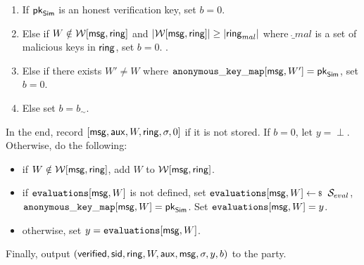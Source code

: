 \begin{tcolorbox}[left=2pt,right=2pt]
\begin{list}{\hspace*{1pt} C}{\setlength\leftmargin{0.15in}}
			\begin{enumerate}
				\item If   $ \mathsf{pk}_{\mathsf{Sim}} $ is an honest verification key, set $ b = 0 $. 
				\label{cond-main:forgery}
				
				\item Else if $ W \notin \mathcal{W}[\mathsf{msg},\mathsf{ring}] $ and $ |\mathcal{W}[\mathsf{msg}, \mathsf{ring}]| \geq |\mathsf{ring}_{mal}| $ where $ \ring_{mal} $ is a set of malicious keys in $ \mathsf{ring} $, set $ b = 0 $.
				\label{cond-main:uniqueness}.
				
				\item Else if there exists $ W' \neq W $ where  $ \mathtt{anonymous\_key\_map}[\mathsf{msg},W'] = \mathsf{pk}_{\mathsf{Sim}} $, set $ b = 0 $. \label{cond-main:differentWforsamepk} 
				\item Else set $ b = b_\sim$. \label{cond-main:simulatorbit}
			\end{enumerate}		
			
		\end{list}
		In the end,  record $ [\mathsf{msg},\mathsf{aux},W,\mathsf{ring},\sigma, 0] $ if it is not stored. If $ b = 0 $, let $y = \perp $. Otherwise,   do the following:
		\begin{itemize}
			\item if $ W \notin \mathcal{W}[\mathsf{msg},\mathsf{ring}] $, add $ W $ to $ \mathcal{W}[\mathsf{msg},\mathsf{ring}]  $.
			\item if $ \texttt{evaluations}[\mathsf{msg},W] $ is not defined, set $ \evaluationslist[\msg, W]\leftsample \setsym{S}_{eval}$, $ \mathtt{anonymous\_key\_map}[\mathsf{msg},W]  = \mathsf{pk}_{\mathsf{Sim}}$.  Set $ \texttt{evaluations}[\mathsf{msg}, W] = y$.
			\item otherwise, set $ y = \texttt{evaluations}[\mathsf{msg}, W]$. 	
		\end{itemize}
		Finally, output $(\mathsf{verified}, \textsf{sid}, \mathsf{ring},W, \mathsf{aux},\mathsf{msg}, \sigma, y, b)$ to the party.
		

\end{tcolorbox}
